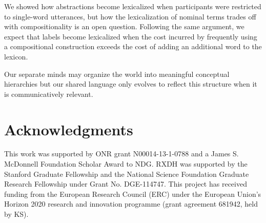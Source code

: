 \documentclass[10pt,letterpaper]{article}
\begin{document}

We showed how abstractions become lexicalized when participants were restricted to single-word utterances, but how the lexicalization of nominal terms trades off with compositionality is an open question. Following the same argument, we expect that labels become lexicalized when the cost incurred by frequently using a compositional construction exceeds the cost of adding an additional word to the lexicon. 

Our separate minds may organize the world into meaningful conceptual hierarchies but our shared language only evolves to reflect this structure when it is communicatively relevant. 


\section{\bf Acknowledgments}
\small
This work was supported by ONR grant N00014-13-1-0788 and a James S. McDonnell Foundation Scholar Award to NDG. RXDH was supported by the Stanford Graduate Fellowship and the National Science Foundation Graduate Research Fellowship under Grant No. DGE-114747. This project has received funding from the European Research Council (ERC) under the European Union's Horizon 2020 research and innovation programme (grant agreement 681942, held by KS).



\setlength{\bibleftmargin}{.125in}
\setlength{\bibindent}{-\bibleftmargin}


\end{document}
